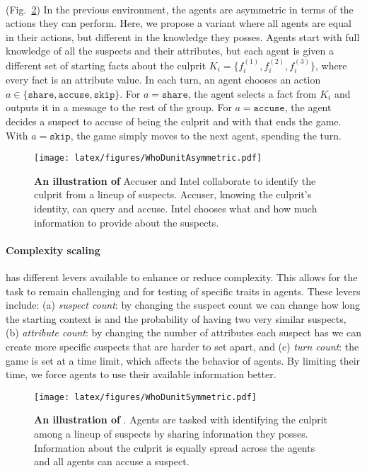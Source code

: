 \paragraph{\ourenvsym{}} (Fig.~\ref{fig:sym_env})
In the previous environment, the agents are asymmetric in terms of the actions they can perform. Here, we propose a variant where all agents are equal in their actions, but different in the knowledge they posses. Agents start with full knowledge of all the suspects and their attributes, but each agent is given a different set of starting facts about the culprit $K_i=\{f_i^{(1)}, f_i^{(2)}, f_i^{(3)}\}$, where every fact is an attribute value. In each turn, an agent chooses an action $a\in \{\texttt{share}, \texttt{accuse}, \texttt{skip}\}$. For $a=\texttt{share}$, the agent selects a fact from $K_i$ and outputs it in a message to the rest of the group. For $a=\texttt{accuse}$, the agent decides a suspect to accuse of being the culprit and with that ends the game. With $a=\texttt{skip}$, the game simply moves to the next agent, spending the turn.



\begin{figure}[t]
    \centering
    \texttt{[image: latex/figures/WhoDunitAsymmetric.pdf]}
    \caption{\textbf{An illustration of \ourenvasym{}} Accuser and Intel collaborate to identify the culprit from a lineup of suspects. Accuser, knowing the culprit's identity, can query and accuse. Intel chooses what and how much information to provide about the suspects.}
    \label{fig:asym_env}
\end{figure}


\paragraph{Complexity scaling}
\ourenv{} has different levers available to enhance or reduce complexity. This allows for the task to remain challenging and for testing of specific traits in agents. These levers include: (a) \textit{suspect count}: by changing the suspect count we can change how long the starting context is and the probability of having two very similar suspects, (b) \textit{attribute count}: by changing the number of attributes each suspect has we can create more specific suspects that are harder to set apart, and (c) \textit{turn count}: the game is set at a time limit, which affects the behavior of agents. By limiting their time, we force agents to use their available information better.



\begin{figure}[t]
    \centering
    \texttt{[image: latex/figures/WhoDunitSymmetric.pdf]}
    \caption{\textbf{An illustration of \ourenvsym{}}. Agents are tasked with identifying the culprit among a lineup of suspects by sharing information they posses. Information about the culprit is equally spread across the agents and all agents can accuse a suspect.}
    \label{fig:sym_env}
\end{figure}
